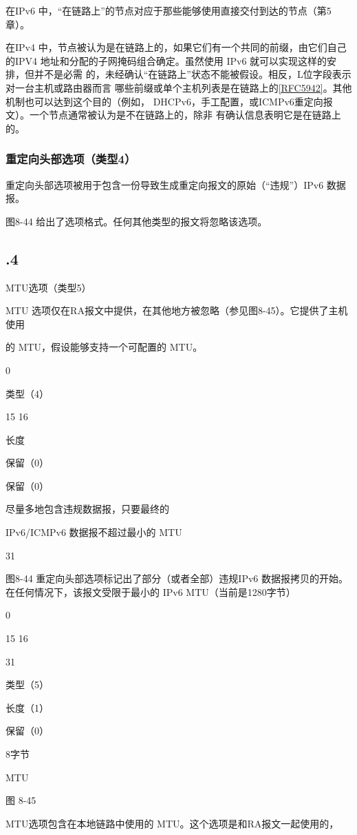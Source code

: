 在IPv6 中，“在链路上”的节点对应于那些能够使用直接交付到达的节点（第5章）。

在IPv4 中，节点被认为是在链路上的，如果它们有一个共同的前缀，由它们自己的IPV4
地址和分配的子网掩码组合确定。虽然使用 IPv6 就可以实现这样的安排，但并不是必需
的，未经确认“在链路上”状态不能被假设。相反，L位字段表示对一台主机或路由器而言
哪些前缀或单个主机列表是在链路上的\href{https://www.rfc-editor.org/rfc/rfc5942}{[RFC5942]}。其他机制也可以达到这个目的（例如，
DHCPv6，手工配置，或ICMPv6重定向报文）。一个节点通常被认为是不在链路上的，除非
有确认信息表明它是在链路上的。

\subsubsection{重定向头部选项（类型4）}
重定向头部选项被用于包含一份导致生成重定向报文的原始（“违规”）IPv6 数据报。

图8-44 给出了选项格式。任何其他类型的报文将忽略该选项。

\subsection{.4}
MTU选项（类型5）

MTU 选项仅在RA报文中提供，在其他地方被忽略（参见图8-45）。它提供了主机使用

的 MTU，假设能够支持一个可配置的 MTU。

0

类型（4）

15 16

长度

保留（0）

保留（0）

尽量多地包含违规数据报，只要最终的

IPv6/ICMPv6 数据报不超过最小的 MTU

31

图8-44 重定向头部选项标记出了部分（或者全部）违规IPv6 数据报拷贝的开始。
在任何情况下，该报文受限于最小的 IPv6 MTU（当前是1280字节）

0

15 16

31

类型（5）

长度（1）

保留（0）

8字节

MTU

图 8-45

MTU选项包含在本地链路中使用的 MTU。这个选项是和RA报文一起使用的，

